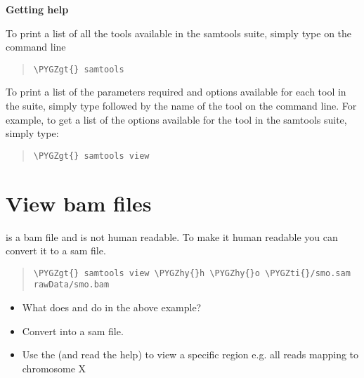 \documentclass[a4paper,11pt,english]{sphinxmanual}
\def\PYGZgt{\char`\>}
\def\PYGZhy{\char`\-}
\def\PYGZti{\char`\~}
\begin{document}
\textbf{Getting help}

To print a list of all the tools available in the samtools suite, simply type  on the command line
\begin{quote}

\begin{Verbatim}[frame=single, rulecolor=\color{lightgray}, fontfamily=courier, commandchars=\\\{\}]
\PYGZgt{} samtools
\end{Verbatim}
\end{quote}

To print a list of the parameters required and options available for each tool in the suite, simply type  followed by the name of the tool on the command line. For example, to get a list of the options available for the  tool in the samtools suite, simply type:
\begin{quote}

\begin{Verbatim}[frame=single, rulecolor=\color{lightgray}, fontfamily=courier, commandchars=\\\{\}]
\PYGZgt{} samtools view
\end{Verbatim}
\end{quote}


\section{View bam files}
\label{exercises/STEP3_viewManipulateAlignmentData_samtools:view-bam-files}
 is a bam file and is not human readable. To make it human readable you can convert it to a sam file.
\begin{quote}

\begin{Verbatim}[frame=single, rulecolor=\color{lightgray}, fontfamily=courier, commandchars=\\\{\}]
\PYGZgt{} samtools view \PYGZhy{}h \PYGZhy{}o \PYGZti{}/smo.sam rawData/smo.bam
\end{Verbatim}
\end{quote}
\begin{itemize}
\item {} 
What does  and  do in the above example?

\item {} 
Convert  into a sam file.

\item {} 
Use the  (and read the help) to view a specific region e.g. all reads mapping to chromosome X

\end{itemize}
\end{document}

